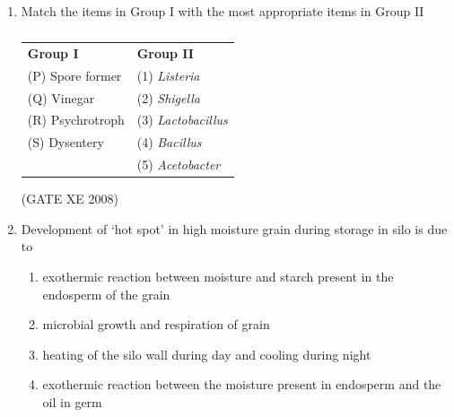 \documentclass[12pt]{article}
\begin{document}
\begin{enumerate}
\begin{enumerate}
\end{enumerate}

(GATE XE 2008)

\item Match the items in Group I with the most appropriate items in Group II  

\begin{table}[H]     \centering     \caption{}     \label{}     \begin{tabular}{l l}

\textbf{Group I} & \textbf{Group II} \\
(P) Spore former & (1) \textit{Listeria} \\
(Q) Vinegar & (2) \textit{Shigella} \\
(R) Psychrotroph & (3) \textit{Lactobacillus} \\
(S) Dysentery & (4) \textit{Bacillus} \\
 & (5) \textit{Acetobacter} \\
\end{tabular} \end{table}  

\begin{enumerate}
\end{enumerate}

(GATE XE 2008)

\item Development of ‘hot spot’ in high moisture grain during storage in silo is due to  

\begin{enumerate}
\item  exothermic reaction between moisture and starch present in the endosperm of the grain 
\item  microbial growth and respiration of grain 
\item  heating of the silo wall during day and cooling during night 
\item  exothermic reaction between the moisture present in endosperm and the oil in germ 
\end{enumerate}


\end{enumerate}
\end{document}
